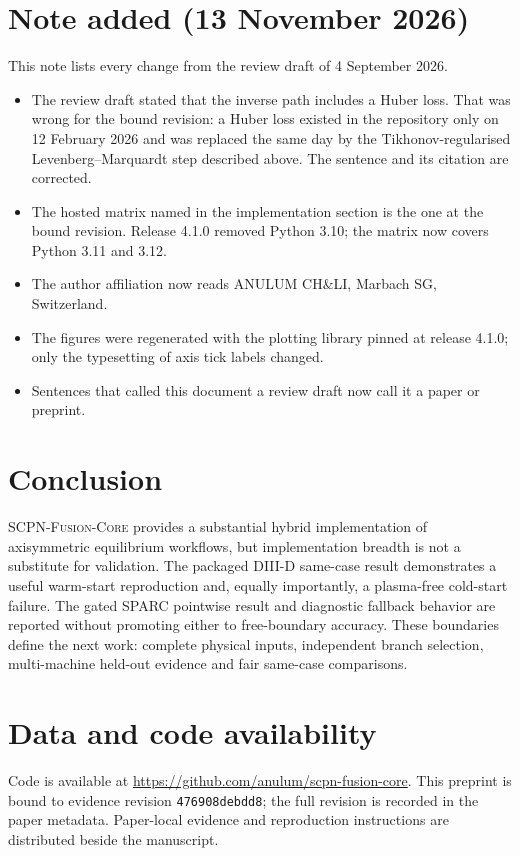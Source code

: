 \documentclass[11pt]{article}
\newcommand{\code}[1]{\texttt{#1}}
\newcommand{\scpn}{\textsc{SCPN-Fusion-Core}}
\begin{document}
\section*{Note added (13 November 2026)}

This note lists every change from the review draft of 4 September 2026.
\begin{itemize}
  \item The review draft stated that the inverse path includes a Huber loss.
        That was wrong for the bound revision: a Huber loss existed in the
        repository only on 12 February 2026 and was replaced the same day by
        the Tikhonov-regularised Levenberg--Marquardt step described above.
        The sentence and its citation are corrected.
  \item The hosted matrix named in the implementation section is the one at
        the bound revision.  Release 4.1.0 removed Python 3.10; the matrix now
        covers Python 3.11 and 3.12.
  \item The author affiliation now reads ANULUM CH\&LI, Marbach SG,
        Switzerland.
  \item The figures were regenerated with the plotting library pinned at
        release 4.1.0; only the typesetting of axis tick labels changed.
  \item Sentences that called this document a review draft now call it a
        paper or preprint.
\end{itemize}

\section{Conclusion}

\scpn{} provides a substantial hybrid implementation of axisymmetric
equilibrium workflows, but implementation breadth is not a substitute for
validation.  The packaged DIII-D same-case result demonstrates a useful
warm-start reproduction and, equally importantly, a plasma-free cold-start
failure.  The gated SPARC pointwise result and diagnostic fallback behavior are
reported without promoting either to free-boundary accuracy.  These boundaries define the next work: complete physical
inputs, independent branch selection, multi-machine held-out evidence and fair
same-case comparisons.

\section*{Data and code availability}

Code is available at \url{https://github.com/anulum/scpn-fusion-core}.  This
preprint is bound to evidence revision \code{476908debdd8}; the full revision is
recorded in the paper metadata.  Paper-local evidence and
reproduction instructions are distributed beside the manuscript.

{\scriptsize}
\end{document}
